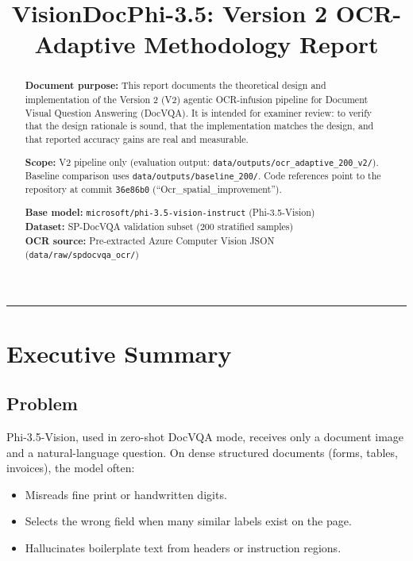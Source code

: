 \documentclass[11pt,a4paper]{article}
\begin{document}
\title{\textbf{VisionDocPhi-3.5: Version 2 OCR-Adaptive Methodology Report}}
\author{}
\date{}
\maketitle

\begin{abstract}
\textbf{Document purpose:} This report documents the theoretical design and implementation of the Version 2 (V2) agentic OCR-infusion pipeline for Document Visual Question Answering (DocVQA). It is intended for examiner review: to verify that the design rationale is sound, that the implementation matches the design, and that reported accuracy gains are real and measurable.

\vspace{0.2cm}
\noindent \textbf{Scope:} V2 pipeline only (evaluation output: \texttt{data/outputs/ocr\_adaptive\_200\_v2/}). Baseline comparison uses \texttt{data/outputs/baseline\_200/}. Code references point to the repository at commit \texttt{36e86b0} (``Ocr\_spatial\_improvement'').

\vspace{0.2cm}
\noindent \textbf{Base model:} \texttt{microsoft/phi-3.5-vision-instruct} (Phi-3.5-Vision) \\
\textbf{Dataset:} SP-DocVQA validation subset (200 stratified samples) \\
\textbf{OCR source:} Pre-extracted Azure Computer Vision JSON (\texttt{data/raw/spdocvqa\_ocr/})
\end{abstract}

\hrule
\vspace{0.5cm}

\section{Executive Summary}

\subsection{Problem}
Phi-3.5-Vision, used in zero-shot DocVQA mode, receives only a document image and a natural-language question. On dense structured documents (forms, tables, invoices), the model often:
\begin{itemize}
    \item Misreads fine print or handwritten digits.
    \item Selects the wrong field when many similar labels exist on the page.
    \item Hallucinates boilerplate text from headers or instruction regions.
\end{itemize}
\end{document}
